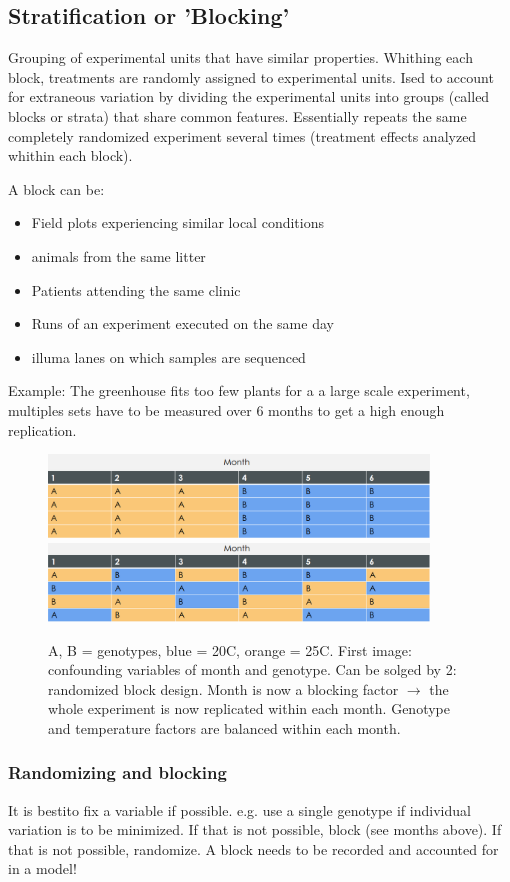 \documentclass{article}
\begin{document}
\subsection{Stratification or 'Blocking'}
Grouping of experimental units that have similar properties. Whithing each block, treatments are randomly assigned to experimental units. Ised to account for extraneous variation by dividing the experimental units into groups (called blocks or strata) that share common features. Essentially repeats the same completely randomized experiment several times (treatment effects analyzed whithin each block).\par 
A block can be:
\begin{itemize}
\item Field plots experiencing similar local conditions
\item animals from the same litter
\item Patients attending the same clinic
\item Runs of an experiment executed on the same day
\item illuma lanes on which samples are sequenced
\end{itemize}
Example:
The greenhouse fits too few plants for a a large scale experiment, multiples sets have to be measured over 6 months to get a high enough replication.
\begin{figure}[h]
\centering
\includegraphics[width = 0.9\textwidth]{exp-design/greenhouse1.png}
\includegraphics[width = 0.9\textwidth]{exp-design/greenhouse2.png}
\caption{A, B = genotypes, blue = 20C, orange = 25C. First image: confounding variables of month and genotype. Can be solged by 2: randomized block design. Month is now a blocking factor $\rightarrow$ the whole experiment is now replicated within each month. Genotype and temperature factors are balanced within each month.}
\end{figure}

\subsubsection{Randomizing and blocking}
It is bestito fix a variable if possible. e.g. use a single genotype if individual variation is to be minimized. If that is not possible, block (see months above). If that is not possible, randomize. A block needs to be recorded and accounted for in a model!\par 
\end{document}
